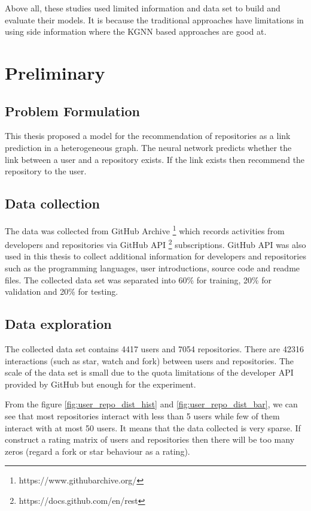 \documentclass[11pt,twoside]{report}
\begin{document}
Above all, these studies used limited information and data set to build and evaluate their models. It is because the traditional approaches have limitations in using side information where the KGNN based approaches are good at.

\chapter{Preliminary}
\section{Problem Formulation}
This thesis proposed a model for the recommendation of repositories as a link prediction in a heterogeneous graph. The neural network predicts whether the link between a user and a repository exists. If the link exists then recommend the repository to the user.

\section{Data collection}
The data was collected from GitHub Archive \footnote{https://www.githubarchive.org/} which records activities from developers and repositories via GitHub API \footnote{https://docs.github.com/en/rest} subscriptions. GitHub API was also used in this thesis to collect additional information for developers and repositories such as the programming languages, user introductions, source code and readme files. The collected data set was separated into 60\% for training, 20\% for validation and 20\% for testing.

\section{Data exploration}
The collected data set contains 4417 users and 7054 repositories. There are 42316 interactions (such as star, watch and fork) between users and repositories. The scale of the data set is small due to the quota limitations of the developer API provided by GitHub but enough for the experiment.

From the figure \ref{fig:user_repo_dist_hist} and \ref{fig:user_repo_dist_bar}, we can see that most repositories interact with less than 5 users while few of them interact with at most 50 users. It means that the data collected is very sparse. If construct a rating matrix of users and repositories then there will be too many zeros (regard a fork or star behaviour as a rating).
\end{document}
